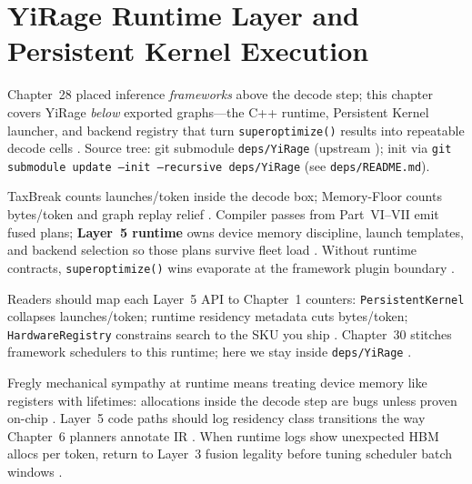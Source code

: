 \chapter{YiRage Runtime Layer and Persistent Kernel Execution}
\label{chap:ch29}

Chapter~28 placed inference \emph{frameworks} above the decode step; this chapter covers YiRage \emph{below} exported graphs---the C++ runtime, Persistent Kernel launcher, and backend registry that turn \texttt{superoptimize()} results into repeatable decode cells \citep{yirage2026,chen2020compilerbasedhardw,patel2025llminference,taxbreak2026,memoryfloor2026,kwon2023vllm,liu2024deepseekv3,nvidia2024cudagraphs,dao2022flashattention,dlbook}. Source tree: git submodule \texttt{deps/YiRage} (upstream \citep{yirage2026}); init via \texttt{git submodule update --init --recursive deps/YiRage} (see \texttt{deps/README.md}).

TaxBreak counts launches/token inside the decode box; Memory-Floor counts bytes/token and graph replay relief \citep{taxbreak2026,memoryfloor2026}. Compiler passes from Part~VI--VII emit fused plans; \textbf{Layer~5 runtime} owns device memory discipline, launch templates, and backend selection so those plans survive fleet load \citep{yirage2026,chen2020compilerbasedhardw,patel2025llminference,kwon2023vllm,taxbreak2026,memoryfloor2026,nvidia2024cudagraphs,dao2022flashattention,liu2024deepseekv3,semianalysis2024tma,amd2024xdna,amd2024aie,dlbook}. Without runtime contracts, \texttt{superoptimize()} wins evaporate at the framework plugin boundary \citep{yirage2026,chen2020compilerbasedhardw,patel2025llminference,kwon2023vllm,nvidia2024cudagraphs,memoryfloor2026,taxbreak2026,dlbook}.

Readers should map each Layer~5 API to Chapter~1 counters: \texttt{PersistentKernel} collapses launches/token; runtime residency metadata cuts bytes/token; \texttt{HardwareRegistry} constrains search to the SKU you ship \citep{yirage2026,chen2020compilerbasedhardw,patel2025llminference,taxbreak2026,memoryfloor2026,amd2024xdna,amd2024aie,semianalysis2024tma,dlbook}. Chapter~30 stitches framework schedulers to this runtime; here we stay inside \texttt{deps/YiRage} \citep{yirage2026,chen2020compilerbasedhardw,kwon2023vllm,patel2025llminference,dlbook}.

Fregly mechanical sympathy at runtime means treating device memory like registers with lifetimes: allocations inside the decode step are bugs unless proven on-chip \citep{yirage2026,chen2020compilerbasedhardw,memoryfloor2026,taxbreak2026,patel2025llminference,dao2022flashattention,dlbook,kwon2023vllm,liu2024deepseekv3,nvidia2024cudagraphs,semianalysis2024tma,amd2024xdna,amd2024aie,dao2023flashdecoding,nvidia2022hopper,dlbook}. Layer~5 code paths should log residency class transitions the way Chapter~6 planners annotate IR \citep{yirage2026,chen2020compilerbasedhardw,patel2025llminference,taxbreak2026,memoryfloor2026,dlbook}. When runtime logs show unexpected HBM allocs per token, return to Layer~3 fusion legality before tuning scheduler batch windows \citep{yirage2026,chen2020compilerbasedhardw,taxbreak2026,memoryfloor2026,patel2025llminference,kwon2023vllm,dao2022flashattention,dlbook}.

